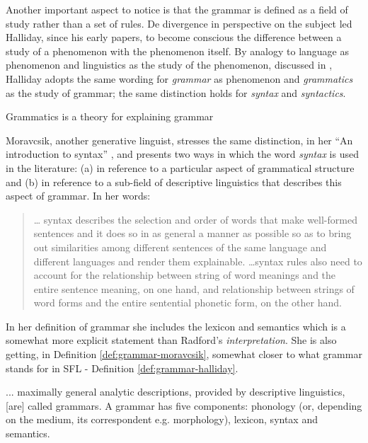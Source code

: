 Another important aspect to notice is that the grammar is defined as a field of study rather than a set of rules. De divergence in perspective on the subject led Halliday, since his early papers, to become conscious the difference between a study of a phenomenon with the phenomenon itself. By analogy to language as phenomenon and linguistics as the study of the phenomenon, discussed in  \citep{Halliday1997-linguistics}, Halliday adopts the same wording for \textit{grammar} as phenomenon and \textit{grammatics} as the study of grammar; the same distinction holds for \textit{syntax} and \textit{syntactics}.

\begin{definition}\label{def:grammatics-halliday}
	Grammatics is a theory for explaining grammar \citep[369]{Halliday2002}
\end{definition}

Moravcsik, another generative linguist, stresses the same distinction, in her ``An introduction to syntax'' \citep{Moravcsik2006}, and presents two ways in which the word \textit{syntax} is used in the literature: (a) in reference to a particular aspect of grammatical structure and (b) in reference to a sub-field of descriptive linguistics that describes this aspect of grammar. 
In her words: 

\begin{quote}
	\dots
	syntax describes the selection and order of words that make well-formed sentences and it does so in as general a manner as possible so as to bring out similarities among different sentences of the same language and different languages and render them explainable. \dots syntax rules also need to account for the relationship between string of word meanings and the entire sentence meaning, on one hand, and relationship between strings of word forms and the entire sentential phonetic form, on the other hand. \citep[25]{Moravcsik2006}	
\end{quote}

In her definition of grammar she includes the lexicon and semantics which is a somewhat more explicit statement than Radford's \textit{interpretation}. She is also getting, in Definition \ref{def:grammar-moravcsik}, somewhat closer to what grammar stands for in SFL - Definition \ref{def:grammar-halliday}. 

\begin{definition}\label{def:grammar-moravcsik}
... maximally general analytic descriptions, provided by descriptive linguistics, [are] called grammars. A grammar has five components: phonology (or, depending on the medium, its correspondent e.g. morphology), lexicon, syntax and semantics\citep[24--25]{Moravcsik2006}. 
\end{definition}

